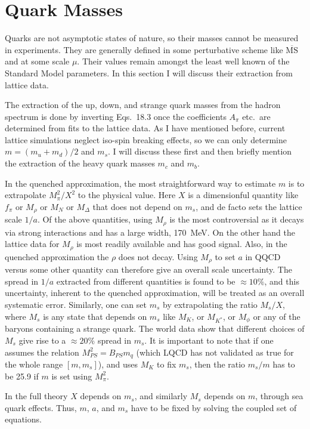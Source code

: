 \chapter{Quark Masses}

Quarks are not asymptotic states of nature, so their masses cannot be measured in experiments. They are generally defined in some perturbative scheme like $\overline{\mathrm{MS}}$ and at some scale $\mu$. Their values remain amongst the least well known of the Standard Model parameters. In this section I will discuss their extraction from lattice data.

The extraction of the up, down, and strange quark masses from the hadron spectrum is done by inverting Eqs.~18.3 once the coefficients $A_\pi$ etc.\ are determined from fits to the lattice data. As I have mentioned before, current lattice simulations neglect iso-spin breaking effects, so we can only determine $m = (m_u + m_d)/2$ and $m_s$. I will discuss these first and then briefly mention the extraction of the heavy quark masses $m_c$ and $m_b$.

In the quenched approximation, the most straightforward way to estimate $m$ is to extrapolate $M_\pi^2/X^2$ to the physical value. Here $X$ is a dimensionful quantity like $f_\pi$ or $M_\rho$ or $M_N$ or $M_\Delta$ that does not depend on $m_s$, and de facto sets the lattice scale $1/a$. Of the above quantities, using $M_\rho$ is the most controversial as it decays via strong interactions and has a large width, 170~MeV. On the other hand the lattice data for $M_\rho$ is most readily available and has good signal. Also, in the quenched approximation the $\rho$ does not decay. Using $M_\rho$ to set $a$ in QQCD versus some other quantity can therefore give an overall scale uncertainty. The spread in $1/a$ extracted from different quantities is found to be $\approx 10\%$, and this uncertainty, inherent to the quenched approximation, will be treated as an overall systematic error. Similarly, one can set $m_s$ by extrapolating the ratio $M_s/X$, where $M_s$ is any state that depends on $m_s$ like $M_K$, or $M_{K^*}$, or $M_\phi$ or any of the baryons containing a strange quark. The world data show that different choices of $M_s$ give rise to a $\approx 20\%$ spread in $m_s$. It is important to note that if one assumes the relation $M_{PS}^2 = B_{PS} m_q$ (which LQCD has not validated as true for the whole range $[m, m_s]$), and uses $M_K$ to fix $m_s$, then the ratio $m_s/m$ has to be 25.9 if $m$ is set using $M_\pi^2$.

In the full theory $X$ depends on $m_s$, and similarly $M_s$ depends on $m$, through sea quark effects. Thus, $m$, $a$, and $m_s$ have to be fixed by solving the coupled set of equations.

